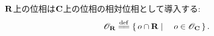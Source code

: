 	\begin{screen}
		\begin{dfn}[$\R$上の位相]
			$\R$上の位相は$\mathbf{C}$上の位相の相対位相として導入する:
			\begin{align}
				\mathscr{O}_{\R} \defeq \Set{o \cap \R}{o \in \mathscr{O}_{\C}}.
			\end{align}
		\end{dfn}
	\end{screen}